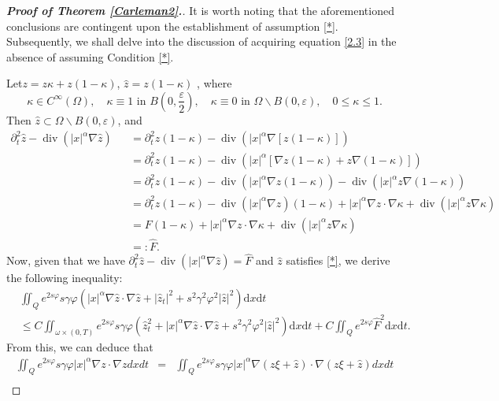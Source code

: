 \documentclass[10pt,a4paper]{amsart}
\DeclareMathOperator{\Div}{div}
\def\Om{\Omega}
\def\al{\alpha}
\def\bf{\textbf}
\def\df{\mathrm d}
\def\ga{\gamma}
\def\om{\omega}
\def\pt{\partial}
\def\ts{\times}
\def\vp{\varphi}
\begin{document}
\begin{proof}[{\rm \bf { Proof of  Theorem \ref{Carleman2}.}}]
			
			It is worth noting that the aforementioned conclusions are contingent upon the establishment of assumption \ref{*}. Subsequently, we shall delve into the discussion of acquiring equation \eqref{2.3} in the absence of assuming Condition \ref{*}.
			
			Let$z=z\kappa + z(1-\kappa)$, $\hat{z}=z(1-\kappa)$ , where
			$$
			\kappa \in C^\infty (\Omega), \quad \kappa \equiv 1 \mbox{ in } B\left(0,\frac{\varepsilon }{2}\right), \quad \kappa \equiv 0 \mbox{ in } \Om\backslash B(0,\varepsilon ), \quad 0\le \kappa \le 1.
			$$
			Then   $\hat{z} \subset \Om\backslash B(0,\varepsilon )$, and
			\begin{eqnarray*}
				\pt_t^2 \hat{z}-\Div\left(|x|^\alpha \nabla \hat{z}\right)
				&&=  \pt_t^2 z(1-\kappa)-\Div\left(|x|^\alpha \nabla\left[  z(1-\kappa)\right] \right)\\
				&&= \pt_t^2 z(1-\kappa)-\Div\left(|x|^\alpha \left[ \nabla z(1-\kappa) + z \nabla (1-\kappa) \right] \right)\\
				&&= \pt_t^2 z(1-\kappa)-\Div\left(|x|^\alpha \nabla z(1-\kappa)\right) -\Div\left(|x|^\alpha z \nabla (1-\kappa)  \right)\\
				&&= \pt_t^2 z(1-\kappa)-\Div\left(|x|^\alpha \nabla z \right)(1-\kappa) + |x|^\alpha \nabla z \cdot \nabla \kappa + \Div\left(|x|^\alpha z \nabla \kappa  \right)\\
				&&= F(1-\kappa) + |x|^\alpha \nabla z \cdot \nabla \kappa + \Div\left(|x|^\alpha z \nabla \kappa  \right)\\
				&&=:\hat{F}.
			\end{eqnarray*}
			Now, given that we have $\pt_t^2 \hat{z}-\Div\left(|x|^\alpha \nabla \hat{z}\right)=\hat{F}$ and $\hat{z}$
			satisfies \eqref{*}, we derive the following inequality:
			\begin{equation}\label{4.6}
				\begin{split}
					&\iint_Qe^{2s\vp}s\ga \vp \left(|x|^\al \nabla \hat{z}\cdot \nabla \hat{z}+|\hat{z}_t|^2+s^2\ga^2\vp^2|\hat{z}|^2\right)\df x\df t\\
					&\leq C\iint_{\om\ts (0,T)}e^{2s\vp}s\ga \vp\left( \hat{z}_t^2+|x|^\al \nabla \hat{z}\cdot \nabla \hat{z} +s^2\ga^2\vp^2|\hat{z}|^2 \right)\df x\df t+C\iint_Qe^{2s\vp} \hat{F}^2\df x\df t.
				\end{split}
			\end{equation}
			From this, we can deduce that
			\begin{eqnarray*}
				\iint_Qe^{2s\vp}s\ga \vp |x|^\al \nabla z\cdot \nabla z dx dt
				&=&\iint_Qe^{2s\vp}s\ga \vp |x|^\al \nabla \left( z\xi + \hat{z}\right) \cdot \nabla \left( z\xi + \hat{z}\right) dx dt\\

\end{eqnarray*}
\end{proof}
\end{document}
